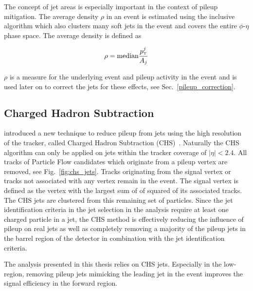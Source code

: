 The concept of jet areas is especially important in the context of pileup
mitigation. The average \pt density $\rho$ in an event is estimated using the inclusive
\kt algorithm which also clusters many soft jets in the event and covers the
entire $\phi$-$\eta$ phase space. The average \pt density is defined as

\begin{equation*}
    \rho = \text{median} \frac{\pt^j}{A_j}
\end{equation*}

$\rho$ is a measure for the underlying event and pileup activity in the event
and is used later on to correct the jets for these effects, see
Sec.~\ref{pileup_correction}.

\subsection{Charged Hadron Subtraction}
\label{sec:chs_algorithm}

\CMS introduced a new technique to reduce pileup from jets using the high
resolution of the tracker, called Charged Hadron Subtraction
(CHS)~\cite{Kirschenmann:2014dla}. Naturally the CHS algorithm can only be
applied on jets within the tracker coverage of $|\eta| < 2.4$. All tracks of
Particle Flow candidates which originate from a pileup vertex are removed, see
Fig.~\ref{fig:chs_jets}. Tracks originating from the signal vertex or tracks not
associated with any vertex remain in the event. The signal vertex is defined as
the vertex with the largest sum of of \pt squared of its associated tracks. The
CHS jets are clustered from this remaining set of particles. Since the jet
identification criteria in the jet selection in the analysis require at least
one charged particle in a jet, the CHS method is effectively reducing the
influence of pileup on real jets as well as completely removing a majority of
the pileup jets in the barrel region of the \CMS detector in combination with
the jet identification criteria.

The analysis presented in this thesis relies on CHS jets. Especially in the
low-\pt region, removing pileup jets mimicking the leading jet in the event
improves the signal efficiency in the forward region.


